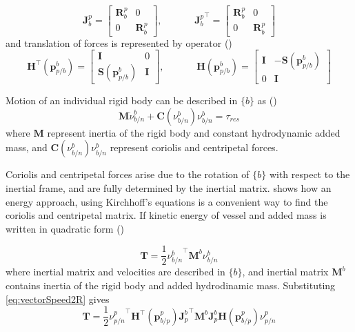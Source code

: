 \begin{equation}
	\textbf{J}_{b}^{p} = \begin{bmatrix} \textbf{R}_{b}^{p} & 0 \\[10pt] 
		0 & \textbf{R}_{b}^{p}\end{bmatrix}, \;\;\;\;\;\;\;\;\;\;\;\; {\textbf{J}_{b}^{p}}^\top = \begin{bmatrix} \textbf{R}_{b}^{p} & 0 \\[10pt] 
		0 & \textbf{R}_{b}^{p}\end{bmatrix}
	\label{eq:operatorJrotationR}
\end{equation} 
and translation of forces is represented by operator (\citet{fossen2011handbook})
\begin{equation}
	\textbf{H}^\top (\textbf{p}_{p/b}^{b}) = \begin{bmatrix} \textbf{I} & 0 \\[10pt] 
		\textbf{S}(\textbf{p}_{p/b}^{b}) & \textbf{I}\end{bmatrix}, \;\;\;\;\;\;\;\;\;\;\;\; \textbf{H}(\textbf{p}_{p/b}^{b}) = \begin{bmatrix} \textbf{I} & -\textbf{S}(\textbf{p}_{p/b}^{b}) \\[10pt] 
		0 & \textbf{I}\end{bmatrix}
	\label{eq:operatorHTranslationR}
\end{equation}


Motion of an individual rigid body can be described in $\{b\}$ as (\citet{fossen2011handbook})
\begin{equation}
	\textbf{M} \dot{\nu}_{b/n}^{b} + \textbf{C}(\nu_{b/n}^{b})\nu_{b/n}^{b}  = \tau_{res} 
	\label{eq:mainmodelR}
\end{equation}
where $ \textbf{M}$ represent inertia of the rigid body and constant hydrodynamic added mass, and $\textbf{C}(\nu_{b/n}^{b})\nu_{b/n}^{b}$ represent coriolis and centripetal forces. 

Coriolis and centripetal forces arise due to the rotation of $\{b\}$ with respect to the inertial frame, and are fully determined by the inertial matrix. \citet{fossen2011handbook} shows how an energy approach, using Kirchhoff's equations is a convenient way to find the coriolis and centripetal matrix. If kinetic energy of vessel and added mass is written in quadratic form (\citet{kirchhoff1869bewegung})

\begin{equation}
	\textbf{T} = \frac{1}{2} {\nu_{b/n}^{b}}^{\top} \textbf{M}^{b} \nu_{b/n}^{b}
\end{equation}
where inertial matrix and velocities are described in $\{b\}$, and inertial matrix $\textbf{M}^{b}$ contains inertia of the rigid body and added hydrodinamic mass. Substituting \ref{eq:vectorSpeed2R} gives
\begin{equation}
	\textbf{T} = \frac{1}{2} {\nu_{p/n}^{p}}^{\top} \textbf{H}^{\top}(\textbf{p}_{b/p}^{p}){\textbf{J}_{p}^{b}}^{\top}  \textbf{M}^{b} \textbf{J}_{p}^{b} \textbf{H}(\textbf{p}_{b/p}^{p}) \nu_{p/n}^{p}
\end{equation}

